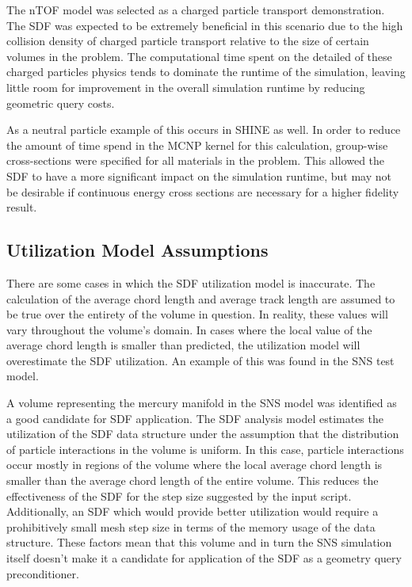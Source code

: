 The nTOF model was selected as a charged particle transport demonstration. The
SDF was expected to be extremely beneficial in this scenario due to the high
collision density of charged particle transport relative to the size of certain
volumes in the problem. The computational time spent on the detailed of these
charged particles physics tends to dominate the runtime of the simulation,
leaving little room for improvement in the overall simulation runtime by
reducing geometric query costs.

As a neutral particle example of this occurs in SHINE as well. In order to
reduce the amount of time spend in the MCNP kernel for this calculation,
group-wise cross-sections were specified for all materials in the problem. This
allowed the SDF to have a more significant impact on the simulation runtime, but
may not be desirable if continuous energy cross sections are necessary for a
higher fidelity result.

\subsection{Utilization Model Assumptions}\label{subsec:sdf_util_model_limits}

There are some cases in which the SDF utilization model is inaccurate. The
calculation of the average chord length and average track length are assumed to
be true over the entirety of the volume in question. In reality, these values
will vary throughout the volume's domain. In cases where the local value of the
average chord length is smaller than predicted, the utilization model will overestimate
the SDF utilization. An example of this was found in the SNS test model.

A volume representing the mercury manifold in the SNS model was identified as a
good candidate for SDF application. The SDF analysis model estimates the
utilization of the SDF data structure under the assumption that the distribution
of particle interactions in the volume is uniform. In this case, particle
interactions occur mostly in regions of the volume where the local average chord
length is smaller than the average chord length of the entire volume. This
reduces the effectiveness of the SDF for the step size suggested by the input
script. Additionally, an SDF which would provide better utilization would
require a prohibitively small mesh step size in terms of the memory usage of the
data structure. These factors mean that this volume and in turn the SNS
simulation itself doesn't make it a candidate for application of the SDF as a
geometry query preconditioner.


